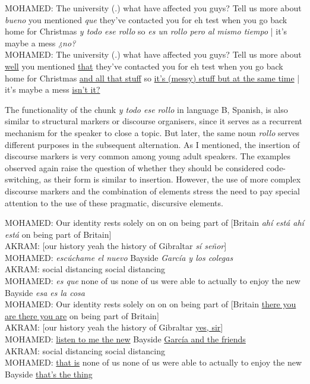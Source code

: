 \documentclass[output=paper]{langscibook}
\begin{document}
\begin{exe}\ex\label{RG:ex4}
MOHAMED:  The university (.) what have affected you guys? Tell us more about \textit{bueno} you mentioned \textit{que} they’ve contacted you for eh test when you go back home for Christmas \textit{y todo ese rollo} so \textit{es un rollo pero al mismo tiempo} | it’s maybe a mess \textit{¿no?}\\

MOHAMED: The university (.) what have affected you guys? Tell us more about \ul{well} you mentioned \ul{that} they’ve contacted you for eh test when you go back home for Christmas \ul{and all that stuff} so \ul{it’s (messy) stuff but at the same time} | it’s maybe a mess \ul{isn’t it?}
\end{exe}

The functionality of the chunk \textit{y todo ese rollo} in language B, Spanish, is also similar to structural markers or discourse organisers, since it serves as a recurrent mechanism for the speaker to close a topic. But later, the same noun \textit{rollo} serves different purposes in the subsequent alternation. As I mentioned, the insertion of discourse markers is very common among young adult speakers. The examples observed again raise the question of whether they should be considered code-switching, as their form is similar to insertion. However, the use of more complex discourse markers and the combination of elements stress the need to pay special attention to the use of these pragmatic, discursive elements.

\largerpage
\begin{exe}\ex\label{RG:ex5}
MOHAMED:  Our identity rests solely on on on being part of [Britain \textit{ahí está ahí está} on being part of Britain]\\
AKRAM: [our history yeah the history of Gibraltar \textit{sí señor}]\\
MOHAMED: \textit{escúchame el nuevo} Bayside \textit{García y los colegas}\\
AKRAM: social distancing social distancing\\
MOHAMED: \textit{es que} none of us none of us were able to actually to enjoy the new Bayside \textit{esa es la cosa}\\

MOHAMED: Our identity rests solely on on on being part of [Britain \ul{there you are there you are} on being part of Britain]\\
AKRAM: [our history yeah the history of Gibraltar \ul{yes, sir}]\\
MOHAMED: \ul{listen to me the new} Bayside \ul{García and the friends}\\
AKRAM: social distancing social distancing\\
MOHAMED: \ul{that is} none of us none of us were able to actually to enjoy the new Bayside \ul{that’s the thing}
\end{exe}
\end{document}
